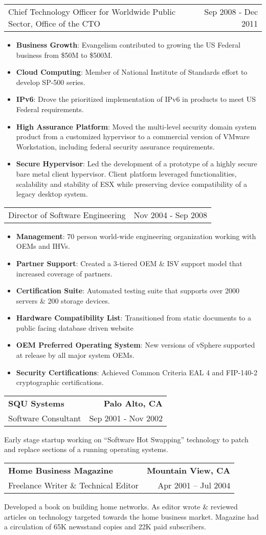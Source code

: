 \documentclass[letterpaper,11pt]{article}
\makeatletter
\newcommand{\resumeSubheading}[4]{
    \item
    \begin{tabular*}{1.0\textwidth}[t]{l@{\extracolsep{\fill}}r}
      \textbf{#1} & \textbf{#2} \\
      {#3} & {#4}
    \end{tabular*}\vspace{-5pt}
  }
\newcommand{\resumeSubSubheading}[2]{
    \vspace{-5pt}
      \item
      \begin{tabular*}{1.0\textwidth}{l@{\extracolsep{\fill}}r}
        {#1} & {#2}
    \end{tabular*}\vspace{-5pt}
}
\newcommand{\resumeJobDescription}[1][]{
    \vspace{-1pt}\par{#1}
}
\newcommand{\resumeItem}[2]{\item{{\textbf{\small#1}}: {\small#2 \vspace{-1pt}}}}
\newcommand{\resumeItemListStart}{\begin{itemize}}
\newcommand{\resumeItemListEnd}{\end{itemize}}\vspace{-10pt}
\makeatother
\begin{document}
          \resumeSubSubheading
            {Chief Technology Officer for Worldwide Public Sector, Office of the CTO}
            {Sep 2008 - Dec 2011}
            \resumeItemListStart
                \resumeItem{Business Growth}{Evangelism contributed to growing the US Federal business from \$50M to \$500M.}
                \resumeItem{Cloud Computing}{Member of National Institute of Standards effort to develop SP-500 series.}
                \resumeItem{IPv6}{Drove the prioritized implementation of IPv6 in products to meet US Federal requirements.}
                \resumeItem{High Assurance Platform}{Moved the multi-level security domain system product from a customized hypervisor to a 
                  commercial version of VMware Workstation, including federal security assurance requirements.}
                \resumeItem{Secure Hypervisor}{Led the development of a prototype of a highly secure bare metal client hypervisor. Client platform leveraged
                  functionalities, scalability and stability of ESX while preserving device compatibility of a legacy desktop system.}
            \resumeItemListEnd
\pagebreak   
          \resumeSubSubheading 
          {Director of Software Engineering}
          {Nov 2004 - Sep 2008}
            \resumeItemListStart
                \resumeItem{Management}{70 person world-wide engineering organization working with OEMs and IHVs.}
                \resumeItem{Partner Support}{Created a 3-tiered OEM \& ISV support model that increased coverage of partners.}
                \resumeItem{Certification Suite}{Automated testing suite that supports over 2000 servers \& 200 storage devices.}
                \resumeItem{Hardware Compatibility List}{Transitioned from static documents to a public facing database driven website}
                \resumeItem{OEM Preferred Operating System}{New versions of vSphere supported at release by all major system OEMs.}
                \resumeItem{Security Certifications}{Achieved Common Criteria EAL 4 and FIP-140-2 cryptographic certifications.}
            \resumeItemListEnd
  
          \resumeSubheading
            {SQU Systems}{Palo Alto, CA}
            {Software Consultant}{Sep 2001 - Nov 2002}
              \resumeJobDescription{
                Early stage startup working on “Software Hot Swapping” technology to patch and replace sections of a running operating
                systems.}

          \resumeSubheading
            {Home Business Magazine}{Mountain View, CA}
            {Freelance Writer \& Technical Editor} {Apr 2001 – Jul 2004}
            \resumeJobDescription {Developed a book on building home networks. As editor wrote \& reviewed articles on technology targeted 
              towards the home business market. Magazine had a circulation of 65K newsstand copies and 22K paid subscribers.}
\end{document}
